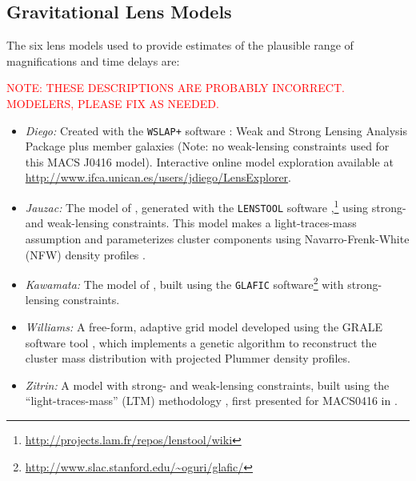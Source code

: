 \subsection{Gravitational Lens Models}\label{sec:LensingModels}



The six lens models used to provide estimates of the plausible range
of magnifications and time delays are:

 \textcolor{red}{NOTE: THESE
  DESCRIPTIONS ARE PROBABLY INCORRECT.  MODELERS, PLEASE FIX AS
  NEEDED.}


\bigskip
\begin{itemize}
\item{\it Diego:} Created with the {\tt WSLAP+} software
  \citep{Sendra:2014}: Weak and Strong Lensing Analysis Package plus
  member galaxies (Note: no weak-lensing constraints used for this
  MACS J0416 model). Interactive online model exploration available at
  \url{http://www.ifca.unican.es/users/jdiego/LensExplorer}.
\item{{\it Jauzac:} The model of \citet{Jauzac:2014}, generated with
  the {\tt LENSTOOL} software
  \citep{Jullo:2007},\footnote{\url{http://projects.lam.fr/repos/lenstool/wiki}}}
  using strong- and weak-lensing constraints.  This model makes a
  light-traces-mass assumption and parameterizes cluster components
  using Navarro-Frenk-White (NFW) density profiles
  \citep{Navarro:1997}.
\item{\it Kawamata:} The model of \citet{Kawamata:2015}, built using the
  {\tt GLAFIC}
  software\footnote{\url{http://www.slac.stanford.edu/~oguri/glafic/}}
  with strong-lensing constraints.
\item{{\it Williams:} A free-form, adaptive grid model developed using
  the GRALE software tool \citep{Liesenborgs:2006, Liesenborgs:2007,
    Mohammed:2014, Sebesta:2016}, which implements a genetic algorithm
  to reconstruct the cluster mass distribution with projected Plummer
  \citeyear{Plummer:1911} density profiles.}
\item{{\it Zitrin:} A model with strong- and weak-lensing constraints,
  built using the ``light-traces-mass'' (LTM) methodology
  \citep{Zitrin:2009a,Zitrin:2015}, first presented for MACS0416 in
  \citet{Zitrin:2013a}.}
\end{itemize}
\bigskip    

